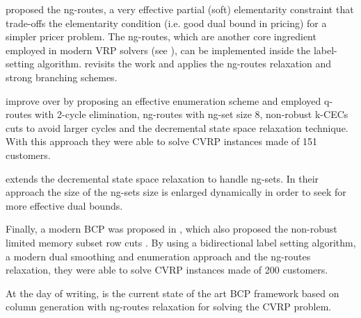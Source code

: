 \textcite{baldacci2011} proposed the ng-routes, a very effective
partial (soft) elementarity constraint
that trade-offs the elementarity condition (i.e. good dual bound in pricing)
for a simpler pricer problem.
The ng-routes,
which are another core ingredient employed in modern VRP solvers (see \cite{pessoa2020a}),
can be implemented inside the label-setting algorithm.
\textcite{ropke2012} revisits the work \citeauthor{fukasawa2006} and applies
the ng-routes relaxation and strong branching schemes.

\textcite{contardo2014} improve over \textcite{contardo2011}
by proposing an effective enumeration scheme and employed
q-routes with 2-cycle elimination, ng-routes with ng-set size 8,
non-robust k-CECs cuts to avoid larger cycles
and the decremental state space relaxation technique.
With this approach they were able to solve CVRP instances made of 151 customers.

\textcite{martinelli2014} extends the decremental state space relaxation
to handle ng-sets.
In their approach the size of the ng-sets size
is enlarged dynamically in order to seek for more effective dual bounds.


Finally, a modern BCP was proposed in \textcite{pecin2017}, which also
proposed the non-robust limited memory subset row cuts \parencite{pecin2017a}.
By using a bidirectional label setting algorithm, a modern dual smoothing and enumeration
approach and the ng-routes relaxation, they were able to solve CVRP
instances made of 200 customers.

At the day of writing, \textcite{pessoa2020a} is the current state of the
art BCP framework based on column generation with ng-routes relaxation
for solving the CVRP problem.






\begin{comment}
\cite{jepsen_branch-and-cut_2011}

Before 1980 very few exact algorithms for cvrp and vrptw had been
proposed, but in the early 1980s two new exact methods where proposed.
From this point the history of exact methods for cvrp and vrptw can
be divided into three phases. The first phase was the introduction of the
Set Partition and the development of Branch-and-Cut-and-Price (bp) algo-
rithms using a relaxed pricing problem. The second was the development of
Branch-and-Cut (bac) algorithms. In the current phase the pricing problem
is no longer relaxed and cuts in the master problem of the Branch-and-Cut-
and-Price algorithms is used. The first two phases where started at the same
point in time and there is still development on the algorithms in the context
of cvrp and vrptw. The algorithms from these two phases are also used
on several other variants of the Vehicle Routing Problem. The third phase
was started in the middle of the 2000s and the algorithms from this phase
are currently the best overall performing algorithms.
\end{comment}


